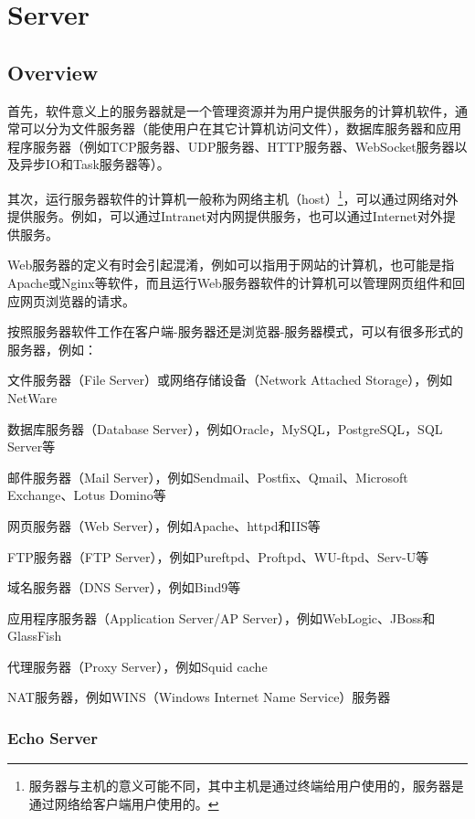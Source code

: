 \part{Server}




\chapter{Overview}

首先，软件意义上的服务器就是一个管理资源并为用户提供服务的计算机软件，通常可以分为文件服务器（能使用户在其它计算机访问文件），数据库服务器和应用程序服务器（例如TCP服务器、UDP服务器、HTTP服务器、WebSocket服务器以及异步IO和Task服务器等）。


其次，运行服务器软件的计算机一般称为网络主机（host）\footnote{服务器与主机的意义可能不同，其中主机是通过终端给用户使用的，服务器是通过网络给客户端用户使用的。}，可以通过网络对外提供服务。例如，可以通过Intranet对内网提供服务，也可以通过Internet对外提供服务。

Web服务器的定义有时会引起混淆，例如可以指用于网站的计算机，也可能是指Apache或Nginx等软件，而且运行Web服务器软件的计算机可以管理网页组件和回应网页浏览器的请求。

按照服务器软件工作在客户端-服务器还是浏览器-服务器模式，可以有很多形式的服务器，例如：

\begin{compactitem}
\item 文件服务器（File Server）或网络存储设备（Network Attached Storage），例如NetWare
\item 数据库服务器（Database Server），例如Oracle，MySQL，PostgreSQL，SQL Server等
\item 邮件服务器（Mail Server），例如Sendmail、Postfix、Qmail、Microsoft Exchange、Lotus Domino等
\item 网页服务器（Web Server），例如Apache、httpd和IIS等
\item FTP服务器（FTP Server），例如Pureftpd、Proftpd、WU-ftpd、Serv-U等
\item 域名服务器（DNS Server），例如Bind9等
\item 应用程序服务器（Application Server/AP Server），例如WebLogic、JBoss和GlassFish
\item 代理服务器（Proxy Server），例如Squid cache
\item NAT服务器，例如WINS（Windows Internet Name Service）服务器
\end{compactitem}



\section{Echo Server} 

